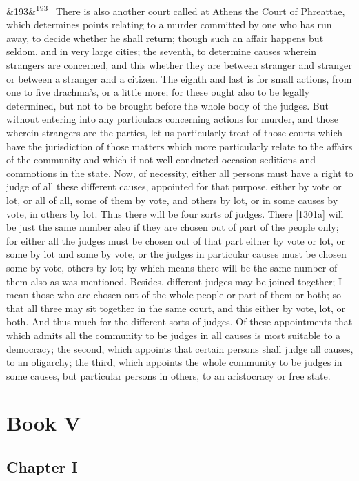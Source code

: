 \documentclass[12pt]{article}
\newcommand{\para}[1][]{\par\noindent\ifx&#1&\else\textsuperscript{\footnotesize #1}~\fi}
\begin{document}
\para[193] There is also another court called at Athens the Court of Phreattae, which determines points relating to a murder committed by one who has run away, to decide whether he shall return; though such an affair happens but seldom, and in very large cities; the seventh, to determine causes wherein strangers are concerned, and this whether they are between stranger and stranger or between a stranger and a citizen. The eighth and last is for small actions, from one to five drachma's, or a little more; for these ought also to be legally determined, but not to be brought before the whole body of the judges. But without entering into any particulars concerning actions for murder, and those wherein strangers are the parties, let us particularly treat of those courts which have the jurisdiction of those matters which more particularly relate to the affairs of the community and which if not well conducted occasion seditions and commotions in the state. Now, of necessity, either all persons must have a right to judge of all these different causes, appointed for that purpose, either by vote or lot, or all of all, some of them by vote, and others by lot, or in some causes by vote, in others by lot. Thus there will be four sorts of judges. There [1301a] will be just the same number also if they are chosen out of part of the people only; for either all the judges must be chosen out of that part either by vote or lot, or some by lot and some by vote, or the judges in particular causes must be chosen some by vote, others by lot; by which means there will be the same number of them also as was mentioned. Besides, different judges may be joined together; I mean those who are chosen out of the whole people or part of them or both; so that all three may sit together in the same court, and this either by vote, lot, or both. And thus much for the different sorts of judges. Of these appointments that which admits all the community to be judges in all causes is most suitable to a democracy; the second, which appoints that certain persons shall judge all causes, to an oligarchy; the third, which appoints the whole community to be judges in some causes, but particular persons in others, to an aristocracy or free state.

\section*{Book V}

\subsection*{Chapter I}
\end{document}
